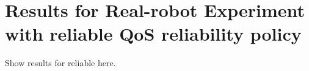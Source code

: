 \chapter{Results for Real-robot Experiment with reliable QoS reliability policy}\label{ch:appendix_a}

Show results for reliable here.
